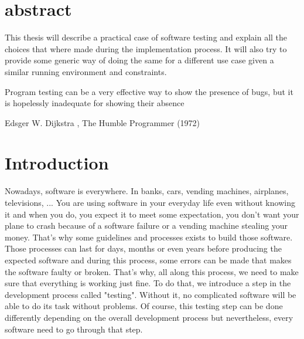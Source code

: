 \documentclass[12pt]{article}
\theoremstyle{definition}
\theoremstyle{definition}
\theoremstyle{remark}
\begin{document}



\section*{abstract}

This thesis will describe a practical case of software testing and explain all the choices that where made during the implementation process. It will also try to provide some generic way of doing the same for a different use case given a similar running environment and constraints.

\clearpage
\pagestyle{plain}
\pagebreak
\hspace{0pt}
\vfill
\epigraph{Program testing can be a very effective way to show the presence of bugs, but it is hopelessly inadequate for showing their absence}{Edsger W. Dijkstra , The Humble Programmer (1972)}
\vfill
\hspace{0pt}
\pagebreak

\clearpage

\tableofcontents

\clearpage

\section{Introduction}

Nowadays, software is everywhere. In banks, cars, vending machines, airplanes, televisions, ... You are using software in your everyday life even without knowing it and when you do, you expect it to meet some expectation, you don't want your plane to crash because of a software failure or a vending machine stealing your money. That's why some guidelines and processes exists to build those software. Those processes can last for days, months or even years before producing the expected software and during this process, some errors can be made that makes the software faulty or broken. That's why, all along this process, we need to make sure that everything is working just fine. To do that, we introduce a step in the development process called "testing". Without it, no complicated software will be able to do its task without problems. Of course, this testing step can be done differently depending on the overall development process but nevertheless, every software need to go through that step.\\
\end{document}
